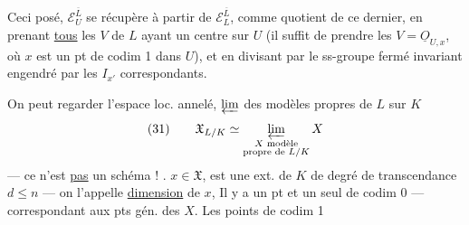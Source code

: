 Ceci posé, $\mathcal E_U^{\overline L}$ se récupère à partir de $\mathcal E_L^{\overline L}$, comme quotient de ce dernier, en prenant \uline{tous} les $V$ de $L$ ayant un centre sur $U$ (il suffit  de prendre les $V=\underline{O}_{U,x}$, où $x$ est un pt de codim 1 dans $U$), et en divisant par le ss-groupe fermé invariant engendré par les $I_{x'}$ correspondants.

On peut regarder l'espace loc. annelé, $\varprojlim$ des modèles  propres de $L$ sur $K$
\[
(31)\qquad\mathfrak X_{L/K}\simeq\varprojlim_{\substack{X\text{ modèle}\\\text{propre de }L/K}}X
\]
--- ce n'est \uline{pas} un schéma ! .  
$x\in\mathfrak X$,   est une ext. de $K$ de degré de transcendance $d\leq n$ --- on l'appelle \uline{dimension} de $x$,  Il y a un pt et un seul de codim 0 --- correspondant aux pts gén. des $X$. Les points de codim 1

